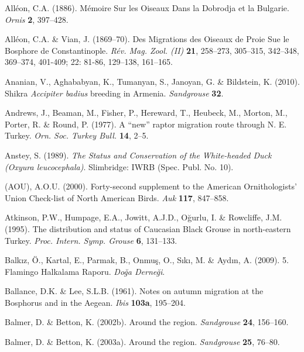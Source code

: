 \documentclass[
  a4paper,
  DIV=11,
  numbers=noendperiod]{scrreprt}
\newlength{\cslhangindent}
\newenvironment{CSLReferences}[2] %
 {\begin{list}{}{%
  \setlength{\itemindent}{0pt}
  \setlength{\leftmargin}{0pt}
  \setlength{\parsep}{0pt}
  \ifodd #1
   \setlength{\leftmargin}{\cslhangindent}
   \setlength{\itemindent}{-1\cslhangindent}
  \fi
  \setlength{\itemsep}{#2\baselineskip}}}
 {\end{list}}
\begin{document}
\begin{CSLReferences}{1}{1}
Alléon, C.A. (1886). {Mémoire Sur les Oiseaux Dans la Dobrodja et la
Bulgarie}. \emph{Ornis} \textbf{2}, 397--428.

Alléon, C.A. \& Vian, J. (1869--70). {Des Migrations des Oiseaux de
Proie Sue le Bosphore de Constantinople}. \emph{Rév. Mag. Zool. (II)}
\textbf{21}, 258--273, 305--315, 342--348, 369--374, 401-409; 22: 81-86,
129--138, 161--165.

Ananian, V., Aghababyan, K., Tumanyan, S., Janoyan, G. \& Bildstein, K.
(2010). {Shikra \emph{Accipiter badius} breeding in Armenia}.
\emph{Sandgrouse} \textbf{32}.

Andrews, J., Beaman, M., Fisher, P., Hereward, T., Heubeck, M., Morton,
M., Porter, R. \& Round, P. (1977). {A {``new''} raptor migration route
through N. E. Turkey}. \emph{Orn. Soc. Turkey Bull.} \textbf{14}, 2--5.

Anstey, S. (1989). \emph{{The Status and Conservation of the
White-headed Duck ({Oxyura leucocephala})}}. Slimbridge: IWRB (Spec.
Publ. No. 10).

(AOU), A.O.U. (2000). {Forty-second supplement to the American
Ornithologists' Union Check-list of North American Birds}. \emph{Auk}
\textbf{117}, 847--858.

Atkinson, P.W., Humpage, E.A., Jowitt, A.J.D., Oğurlu, I. \& Rowcliffe,
J.M. (1995). {The distribution and status of Caucasian Black Grouse in
north-eastern Turkey}. \emph{Proc. Intern. Symp. Grouse} \textbf{6},
131--133.

Balkız, Ö., Kartal, E., Parmak, B., Onmuş, O., Sıkı, M. \& Aydın, A.
(2009). {5. Flamingo Halkalama Raporu}. \emph{Doğa Derneği}.

Ballance, D.K. \& Lee, S.L.B. (1961). {Notes on autumn migration at the
Bosphorus and in the Aegean}. \emph{Ibis} \textbf{103a}, 195--204.

Balmer, D. \& Betton, K. (2002b). {Around the region}. \emph{Sandgrouse}
\textbf{24}, 156--160.

Balmer, D. \& Betton, K. (2003a). {Around the region}. \emph{Sandgrouse}
\textbf{25}, 76--80.


\end{CSLReferences}
\end{document}
